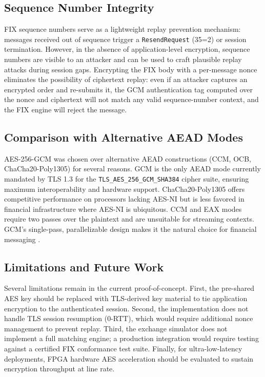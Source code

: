 \documentclass[twocolumn,10pt]{article}
\begin{document}
\subsection{Sequence Number Integrity}

FIX sequence numbers serve as a lightweight replay prevention mechanism:
messages received out of sequence trigger a \texttt{ResendRequest} (35=2)
or session termination. However, in the absence of application-level
encryption, sequence numbers are visible to an attacker and can be used
to craft plausible replay attacks during session gaps. Encrypting the FIX
body with a per-message nonce eliminates the possibility of ciphertext
replay: even if an attacker captures an encrypted order and re-submits it,
the GCM authentication tag computed over the nonce and ciphertext will not
match any valid sequence-number context, and the FIX engine will reject the
message.

\subsection{Comparison with Alternative AEAD Modes}

AES-256-GCM was chosen over alternative AEAD constructions (CCM, OCB,
ChaCha20-Poly1305) for several reasons. GCM is the only AEAD mode currently
mandated by TLS 1.3 \cite{rfc8446} for the \texttt{TLS\_AES\_256\_GCM\_SHA384}
cipher suite, ensuring maximum interoperability and hardware support.
ChaCha20-Poly1305 offers competitive performance on processors lacking
AES-NI but is less favored in financial infrastructure where AES-NI is
ubiquitous. CCM and EAX modes require two passes over the plaintext and
are unsuitable for streaming contexts. GCM's single-pass, parallelizable
design makes it the natural choice for financial messaging \cite{mcgrew2004gcm}.

\subsection{Limitations and Future Work}

Several limitations remain in the current proof-of-concept. First, the
pre-shared AES key should be replaced with TLS-derived key material to
tie application encryption to the authenticated session. Second, the
implementation does not handle TLS session resumption (0-RTT), which
would require additional nonce management to prevent replay. Third, the
exchange simulator does not implement a full matching engine; a production
integration would require testing against a certified FIX conformance
test suite. Finally, for ultra-low-latency deployments, FPGA hardware AES
acceleration \cite{lockwood2012hft} should be evaluated to sustain
encryption throughput at line rate.
\end{document}
